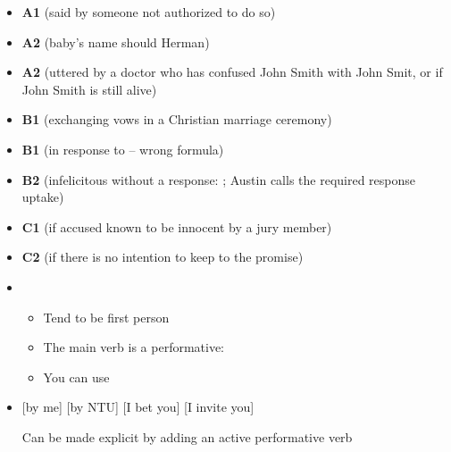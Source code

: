 \documentclass[headrule,footrule]{foils}
\begin{document}
\begin{itemize} \addtolength{\itemsep}{-2ex}
\item \textbf{A1}  (said by someone not authorized to do so)
\item \textbf{A2}  (baby’s name should Herman)
\item \textbf{A2}  (uttered by a doctor who has confused John Smith
with John Smit, or if John Smith is still alive)
\item \textbf{B1}
 (exchanging vows in a Christian marriage ceremony)
\item \textbf{B1}
 (in response to  – wrong formula)
\item \textbf{B2}
 (infelicitous without a response: ; Austin calls the required response uptake)
\item \textbf{C1}
 (if accused known to be innocent by a jury member)
\item \textbf{C2}
 (if there is no intention to keep to the promise)
\end{itemize}


\begin{itemize}
\item {}
  \begin{itemize}
  \item Tend to be first person
  \item The main verb  is a performative: 
  \item You can use 
  \end{itemize}
\item {}
  \begin{exe}
    \ex {} [by me]
    \ex {} [by NTU]
    \ex {} [I bet you] 
    \ex {} [I invite you]
  \end{exe}
  Can be made explicit by adding an active performative verb
\end{itemize}
\end{document}
